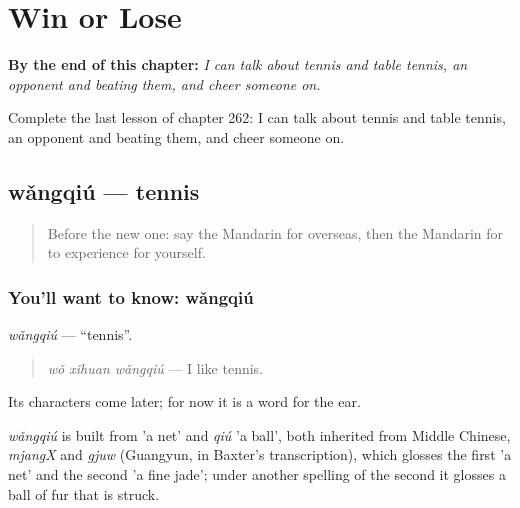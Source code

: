 
\chapter{Win or Lose}
\label{ch:zh-win-or-lose}

\begin{chapteropening}
\textbf{By the end of this chapter:} \emph{I can talk about tennis and table tennis, an opponent and beating them, and cheer someone on.}

Complete the last lesson of chapter 262: I can talk about tennis and table tennis, an opponent and beating them, and cheer someone on.
\end{chapteropening}

\section[wǎngqiú]{wǎngqiú — tennis}

\label{lesson:ZH-C262-wangqiu}



\begin{quote}
Before the new one: say the Mandarin for overseas, then the Mandarin for to experience for yourself.
\end{quote}

\subsection*{You'll want to know: wǎngqiú}
\emph{wǎngqiú} — \textquotedblleft{}tennis\textquotedblright{}.

\begin{quote}
\emph{wǒ xǐhuan wǎngqiú} — I like tennis.
\end{quote}

Its characters come later; for now it is a word for the ear.

\begin{cousinweb}
\emph{wǎngqiú} is built from  'a net' and \emph{qiú} 'a ball', both inherited from Middle Chinese, \emph{mjangX} and \emph{gjuw} (Guangyun, in Baxter's transcription), which glosses the first 'a net' and the second 'a fine jade'; under another spelling of the second it glosses a ball of fur that is struck.
\end{cousinweb}

